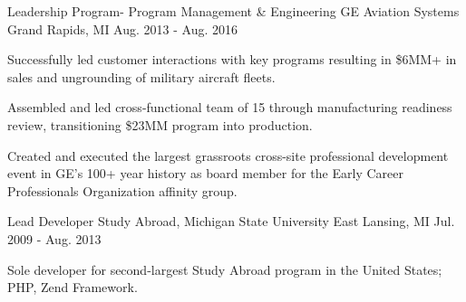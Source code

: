 \begin{cventries}
    \cventry
      {Leadership Program- Program Management \& Engineering} %
      {GE Aviation Systems} %
      {Grand Rapids, MI} %
      {Aug. 2013 - Aug. 2016} %
      {
        \begin{cvitems} %
          \item {Successfully led customer interactions with key programs resulting in \$6MM+ in sales and ungrounding of military aircraft fleets.}
          \item {Assembled and led cross-functional team of 15 through manufacturing readiness review, transitioning \$23MM program into production.}
	  \item {Created and executed the largest grassroots cross-site professional development event in GE's 100+ year history as board member for the Early Career Professionals Organization affinity group.}
        \end{cvitems}
      }

      \cventry
        {Lead Developer} %
        {Study Abroad, Michigan State University} %
        {East Lansing, MI} %
        {Jul. 2009 - Aug. 2013} %
        {
          \begin{cvitems} %
            \item {Sole developer for second-largest Study Abroad program in the United States; PHP, Zend Framework.}
          \end{cvitems}
        }
\end{cventries}
